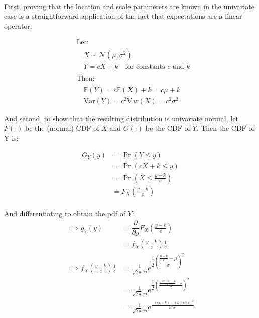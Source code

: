 \documentclass[
]{article}
\begin{document}
\leavevmode\hypertarget{univariate}{}%
~

First, proving that the location and scale parameters are known in the
univariate case is a straightforward application of the fact that
expectations are a linear operator:

\begin{align}
&\text{Let:} \nonumber \\
\nonumber \\
& \quad X \sim \mathcal{N}(\mu,\sigma^2) \nonumber \\[1ex]
& \quad Y = cX + k \quad \text{for constants $c$ and $k$} \nonumber \\
\nonumber \\
&\text{Then:}\nonumber \\
\nonumber \\
&\quad \mathbb{E}(Y) = c\mathbb{E}(X) + k = c\mu + k \nonumber  \\[1ex]
&\quad \mathrm{Var}(Y) = c^2\mathrm{Var}(X) = c^2\sigma^2 \nonumber 
\end{align}

And second, to show that the resulting distribution is univariate
normal, let \(F(\cdot)\) be the (normal) CDF of \(X\) and \(G(\cdot)\)
be the CDF of \(Y\). Then the CDF of Y is:

\begin{align}
G_Y(y) &= \Pr(Y \leq y) \nonumber \\[2ex]
&= \Pr(cX + k \leq y)  \nonumber \\[2ex]
&= \Pr\left(X \leq \frac{y-k}{c}\right) \nonumber \\[2ex]
&= F_X\left(\frac{y-k}{c}\right) \\[2ex]
\end{align}

And differentiating to obtain the pdf of \(Y\): \begin{align}
\implies g_Y(y) &= \dfrac{\partial}{\partial y} F_X\left(\frac{y-k}{c}\right)  \nonumber \\[2ex]
&= f_X\left(\frac{y-k}{c}\right)\frac{1}{c} \nonumber \\[2ex]
\implies f_X\left(\frac{y-k}{c}\right)\frac{1}{c} &= \frac{1}{\sqrt{2\pi}c\sigma} e^{\dfrac{1}{2}\left(\dfrac{\frac{y-k}{c}-\mu}{\sigma}\right)^2} \nonumber \\[2ex]
&=\frac{1}{\sqrt{2\pi}c\sigma} e^{\dfrac{1}{2}\left(\frac{\frac{(cx+k)-k}{c}-\mu}{\sigma}\right)^2}\nonumber \\[2ex]
&=\frac{1}{\sqrt{2\pi}c\sigma} e^{\frac{\left[(cx+k)-(k+c\mu)\right]^2}{2c^2\sigma^2}} \label{pdf.y}
\end{align}
\end{document}
